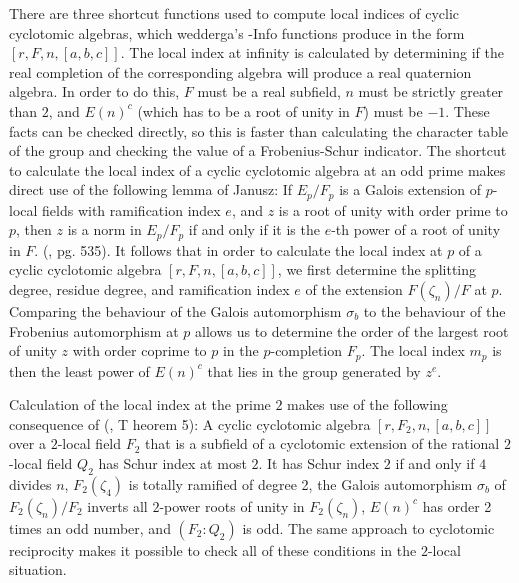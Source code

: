 \documentclass[a4paper,11pt]{report}
\begin{document}
{{ There are three shortcut functions used to compute local indices of cyclic
cyclotomic algebras, which wedderga's -Info functions produce in the form $[r,F,n,[a,b,c]]$. The local index at infinity is calculated by determining if the real
completion of the corresponding algebra will produce a real quaternion
algebra. In order to do this, $F$ must be a real subfield, $n$ must be strictly greater than $2$, and $E(n)^c$ (which has to be a root of unity in $F$) must be $-1$. These facts can be checked directly, so this is faster than calculating the
character table of the group and checking the value of a Frobenius-Schur
indicator. The shortcut to calculate the local index of a cyclic cyclotomic
algebra at an odd prime makes direct use of the following lemma of Janusz: If $E_p/F_p$ is a Galois extension of $p$-local fields with ramification index $e$, and $z$ is a root of unity with order prime to $p$, then $z$ is a norm in $E_p/F_p$ if and only if it is the $e$-th power of a root of unity in $F$. (\cite{J}, pg. 535). It follows that in order to calculate the local index at $p$ of a cyclic cyclotomic algebra $[r,F,n,[a,b,c]]$, we first determine the splitting degree, residue degree, and ramification
index $e$ of the extension $F(\zeta_n)/F$ at $p$. Comparing the behaviour of the Galois automorphism $\sigma_b$ to the behaviour of the Frobenius automorphism at $p$ allows us to determine the order of the largest root of unity $z$ with order coprime to $p$ in the $p$-completion $F_p$. The local index $m_p$ is then the least power of $E(n)^c$ that lies in the group generated by $z^e$. 

 Calculation of the local index at the prime $2$ makes use of the following consequence of (\cite{J}, T heorem 5): A cyclic cyclotomic algebra $[r,F_2,n,[a,b,c]]$ over a $2$-local field $F_2$ that is a subfield of a cyclotomic extension of the rational $2$-local field $Q_2$ has Schur index at most $2$. It has Schur index $2$ if and only if $4$ divides $n$, $F_2(\zeta_4)$ is totally ramified of degree 2, the Galois automorphism $\sigma_b$ of $F_2(\zeta_n)/F_2$ inverts all $2$-power roots of unity in $F_2(\zeta_n)$, $E(n)^c$ has order 2 times an odd number, and $(F_2:Q_2)$ is odd. The same approach to cyclotomic reciprocity makes it possible to check
all of these conditions in the $2$-local situation. 

}}
\end{document}
